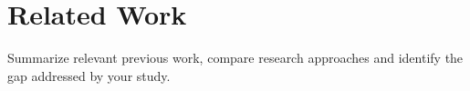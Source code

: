 \chapter{Related Work}\label{chap:related-work}
Summarize relevant previous work, compare research approaches and identify the gap addressed by your study.

